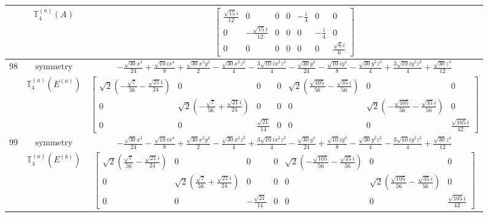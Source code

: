 \documentclass[fleqn,8pt,landscape]{jsarticle}
\begin{document}
\begin{longtable}{ccc}
$  $ & $ \mathbb{T}_{4}^{(a)}(A) $ & $ \begin{bmatrix} \frac{\sqrt{15} i}{12} & 0 & 0 & 0 & - \frac{i}{4} & 0 & 0 \\ 0 & - \frac{\sqrt{15} i}{12} & 0 & 0 & 0 & - \frac{i}{4} & 0 \\ 0 & 0 & 0 & 0 & 0 & 0 & \frac{\sqrt{6} i}{6} \end{bmatrix} $ \\ \hline
$ 98 $ & $ \text{symmetry} $ & $ - \frac{\sqrt{30} x^{4}}{24} + \frac{\sqrt{10} i x^{4}}{8} + \frac{\sqrt{30} x^{2} y^{2}}{2} - \frac{\sqrt{30} x^{2} z^{2}}{4} - \frac{3 \sqrt{10} i x^{2} z^{2}}{4} - \frac{\sqrt{30} y^{4}}{24} - \frac{\sqrt{10} i y^{4}}{8} - \frac{\sqrt{30} y^{2} z^{2}}{4} + \frac{3 \sqrt{10} i y^{2} z^{2}}{4} + \frac{\sqrt{30} z^{4}}{12} $ \\
$  $ & $ \mathbb{T}_{4}^{(a)}(E^{(a)}) $ & $ \begin{bmatrix} \sqrt{2} \left(- \frac{\sqrt{7}}{56} - \frac{\sqrt{21} i}{24}\right) & 0 & 0 & 0 & \sqrt{2} \left(\frac{\sqrt{105}}{56} - \frac{\sqrt{35} i}{56}\right) & 0 & 0 \\ 0 & \sqrt{2} \left(- \frac{\sqrt{7}}{56} + \frac{\sqrt{21} i}{24}\right) & 0 & 0 & 0 & \sqrt{2} \left(- \frac{\sqrt{105}}{56} - \frac{\sqrt{35} i}{56}\right) & 0 \\ 0 & 0 & \frac{\sqrt{21}}{14} & 0 & 0 & 0 & \frac{\sqrt{105} i}{42} \end{bmatrix} $ \\ \hline
$ 99 $ & $ \text{symmetry} $ & $ - \frac{\sqrt{30} x^{4}}{24} - \frac{\sqrt{10} i x^{4}}{8} + \frac{\sqrt{30} x^{2} y^{2}}{2} - \frac{\sqrt{30} x^{2} z^{2}}{4} + \frac{3 \sqrt{10} i x^{2} z^{2}}{4} - \frac{\sqrt{30} y^{4}}{24} + \frac{\sqrt{10} i y^{4}}{8} - \frac{\sqrt{30} y^{2} z^{2}}{4} - \frac{3 \sqrt{10} i y^{2} z^{2}}{4} + \frac{\sqrt{30} z^{4}}{12} $ \\
$  $ & $ \mathbb{T}_{4}^{(a)}(E^{(b)}) $ & $ \begin{bmatrix} \sqrt{2} \left(\frac{\sqrt{7}}{56} - \frac{\sqrt{21} i}{24}\right) & 0 & 0 & 0 & \sqrt{2} \left(- \frac{\sqrt{105}}{56} - \frac{\sqrt{35} i}{56}\right) & 0 & 0 \\ 0 & \sqrt{2} \left(\frac{\sqrt{7}}{56} + \frac{\sqrt{21} i}{24}\right) & 0 & 0 & 0 & \sqrt{2} \left(\frac{\sqrt{105}}{56} - \frac{\sqrt{35} i}{56}\right) & 0 \\ 0 & 0 & - \frac{\sqrt{21}}{14} & 0 & 0 & 0 & \frac{\sqrt{105} i}{42} \end{bmatrix} $ \\ \hline

\end{longtable}
\end{document}
